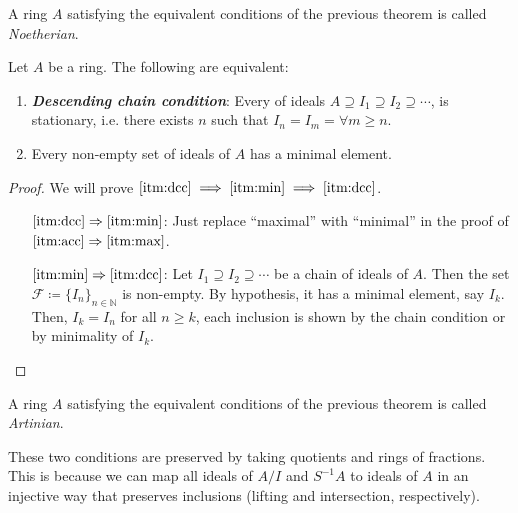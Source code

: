 \begin{defn}
    A ring $A$ satisfying the equivalent conditions of the previous theorem is called \emph{Noetherian}.
\end{defn}

\begin{theorem}
    Let $A$ be a ring.
    The following are equivalent:
    \begin{enumerate}
        \item \label{itm:dcc}
        \emph{\textbf{Descending chain condition}}:
        Every of ideals $A \supseteq I_1 \supseteq I_2 \supseteq \cdots$,
        is stationary, i.e.
        there exists $n$ such that $I_n = I_{m} = \forall m \geq n$.

        \item \label{itm:min}
        Every non-empty set of ideals of $A$ has a minimal element.
    \end{enumerate}

    \begin{proof}
        We will prove $ \eqref{itm:dcc} \implies \eqref{itm:min} \implies \eqref{itm:dcc}$.
        \begin{itemize}[align=left]

            \item[$\eqref{itm:dcc} \Rightarrow \eqref{itm:min}$:]
            Just replace ``maximal'' with ``minimal'' in the proof of $\eqref{itm:acc} \Rightarrow \eqref{itm:max}$.

            \item[$\eqref{itm:min} \Rightarrow \eqref{itm:dcc}$:]
            Let $I_1 \supseteq I_2 \supseteq \cdots$ be a chain of ideals of $A$.
            Then the set $\mathcal{F} \coloneqq \{I_n\}_{n \in \mathbb{N}}$ is non-empty.
            By hypothesis, it has a minimal element, say $I_k$.
            Then, $I_k = I_n$ for all $n \geq k$, each inclusion is shown by the chain condition or by minimality of $I_k$.

        \end{itemize}
    \end{proof}
\end{theorem}

\begin{defn}
    A ring $A$ satisfying the equivalent conditions of the previous theorem is called \emph{Artinian}.
\end{defn}

\begin{rk}
    These two conditions are preserved by taking quotients and rings of fractions.
    This is because we can map all ideals of $A/I$ and $S^{-1} A$ to ideals of $A$
    in an injective way that preserves inclusions (lifting and intersection, respectively).
\end{rk}

